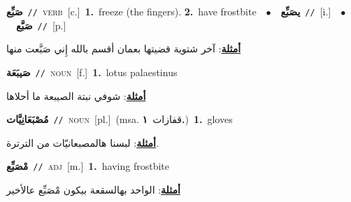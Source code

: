 \documentclass[10pt,a4paper,twoside]{article} %
\begin{document}
\begin{multicols}{2}
{{{{{{{{\setlength\topsep{0pt}\textbf{\foreignlanguage{arabic}{صَبِّع}}\ {\color{gray}\texttt{//}\color{black}}\ \textsc{verb}\ [c.]\ \textbf{1.}~freeze (the fingers).  \textbf{2.}~have frostbite\ \ $\bullet$\ \ \setlength\topsep{0pt}\textbf{\foreignlanguage{arabic}{يصَبِّع}}\ {\color{gray}\texttt{//}\color{black}}\ [i.]\ \ $\bullet$\ \ \setlength\topsep{0pt}\textbf{\foreignlanguage{arabic}{صَبَّع}}\ {\color{gray}\texttt{//}\color{black}}\ [p.]\  \begin{flushright}\color{gray}\foreignlanguage{arabic}{\textbf{\underline{\foreignlanguage{arabic}{أمثلة}}}: آخر شتوية قضيتها بعمان أقسم بالله إِني صَبَّعت منها}\end{flushright}\color{black}} \vspace{2mm}

{\setlength\topsep{0pt}\textbf{\foreignlanguage{arabic}{صَيبَعَة}}\ {\color{gray}\texttt{//}\color{black}}\ \textsc{noun}\ [f.]\ \textbf{1.}~lotus palaestinus\  \begin{flushright}\color{gray}\foreignlanguage{arabic}{\textbf{\underline{\foreignlanguage{arabic}{أمثلة}}}: شوفي نبتة الصيبعة ما أحلاها}\end{flushright}\color{black}} \vspace{2mm}

{\setlength\topsep{0pt}\textbf{\foreignlanguage{arabic}{مُصْبَعَانِيَّات}}\ {\color{gray}\texttt{//}\color{black}}\ \textsc{noun}\ [pl.]\ \color{gray}(msa. \foreignlanguage{arabic}{قفازات}~\foreignlanguage{arabic}{\textbf{١.}})\color{black}\ \textbf{1.}~gloves\  \begin{flushright}\color{gray}\foreignlanguage{arabic}{\textbf{\underline{\foreignlanguage{arabic}{أمثلة}}}: لبسنا هالمصبعانيّات من الترترة.}\end{flushright}\color{black}} \vspace{2mm}

{\setlength\topsep{0pt}\textbf{\foreignlanguage{arabic}{مْصَبِّع}}\ {\color{gray}\texttt{//}\color{black}}\ \textsc{adj}\ [m.]\ \textbf{1.}~having frostbite\  \begin{flushright}\color{gray}\foreignlanguage{arabic}{\textbf{\underline{\foreignlanguage{arabic}{أمثلة}}}: الواحد بهالسقعة بيكون مْصَبِّع عالأخير}\end{flushright}\color{black}} \vspace{2mm}

}}}}}}}
\end{multicols}
\end{document}
